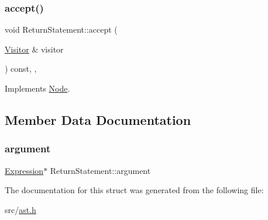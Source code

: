 \subsubsection{\texorpdfstring{accept()}{accept()}}
{\footnotesize\ttfamily void Return\+Statement\+::accept (\begin{DoxyParamCaption}\item[{\hyperlink{struct_visitor}{Visitor} \&}]{visitor }\end{DoxyParamCaption}) const\hspace{0.3cm}{\ttfamily [inline]}, {\ttfamily [override]}, {\ttfamily [virtual]}}



Implements \hyperlink{struct_node_a10bd7af968140bbf5fa461298a969c71}{Node}.



\subsection{Member Data Documentation}
\mbox{\label{struct_return_statement_aeead2cb2bcecfed685d54bb7ee5456f2}} 
\subsubsection{\texorpdfstring{argument}{argument}}
{\footnotesize\ttfamily \hyperlink{struct_expression}{Expression}$\ast$ Return\+Statement\+::argument}



The documentation for this struct was generated from the following file\+:\begin{DoxyCompactItemize}
\item 
src/\hyperlink{ast_8h}{ast.\+h}\end{DoxyCompactItemize}
